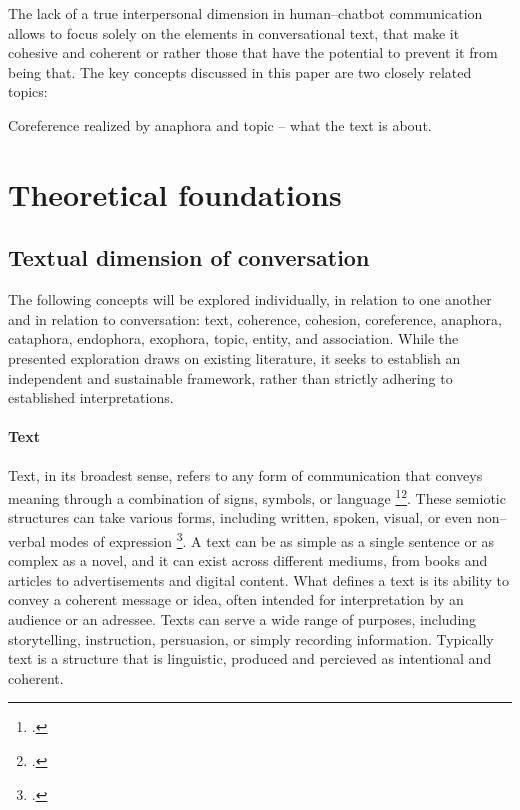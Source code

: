 \documentclass[12pt]{report}
\begin{document}
{\par
The lack of a true interpersonal dimension in human–chatbot communication
allows to focus solely on the elements in conversational text,
that make it cohesive and coherent or rather
those that have the potential to prevent it from being that.
The key concepts discussed in this paper are
two closely related topics:

Coreference realized by anaphora and topic – what the text is about.



\chapter{Theoretical foundations}


\section{Textual dimension of conversation}
\par
    The following concepts will be explored individually, in relation to one another and in relation to conversation:
    text, coherence, cohesion, coreference, anaphora, cataphora, endophora, exophora, topic, entity, and association.
    While the presented exploration draws on existing literature,
    it seeks to establish an independent and sustainable framework,
    rather than strictly adhering to established interpretations.

\subsubsection{Text}
\par
    Text, in its broadest sense, refers to any form of communication that conveys meaning through a combination of signs, symbols, or language \footcite[p.~7]{hrbacek1994}\footcite{hjelmslev2016}.
    These semiotic structures can take various forms, including written, spoken, visual, or even non–verbal modes of expression \footcite[p.~13]{barthes1977image}.
    A text can be as simple as a single sentence or as complex as a novel, and it can exist across different mediums, from books and articles to advertisements and digital content.
    What defines a text is its ability to convey a coherent message or idea, often intended for interpretation by an audience or an adressee.
    Texts can serve a wide range of purposes, including storytelling, instruction, persuasion, or simply recording information.
    Typically text is a structure that is
    linguistic, produced and percieved as intentional and coherent.

}
\end{document}
